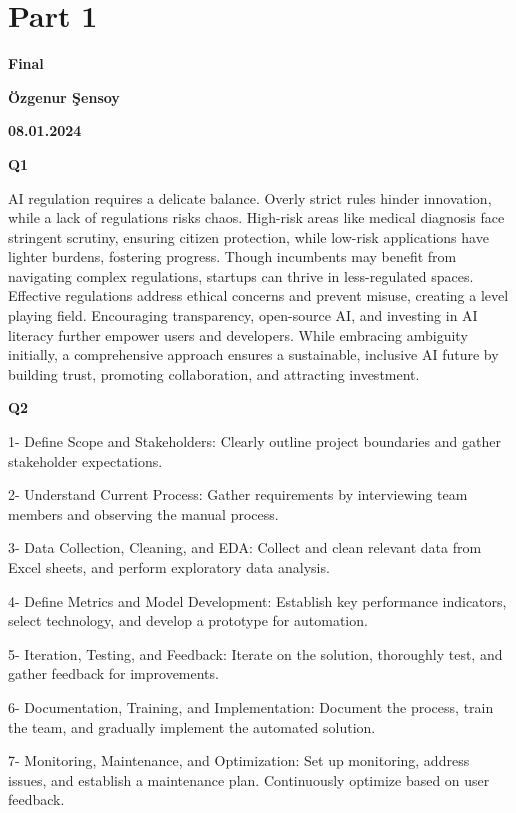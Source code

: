 \documentclass[
  letterpaper,
  DIV=11,
  numbers=noendperiod]{scrreprt}
\begin{document}

\hypertarget{part-1}{%
\chapter{\texorpdfstring{\textbf{Part 1}}{Part 1}}\label{part-1}}

\textbf{Final}

\textbf{Özgenur Şensoy}

\textbf{08.01.2024}

\textbf{Q1}

AI regulation requires a delicate balance. Overly strict rules hinder
innovation, while a lack of regulations risks chaos. High-risk areas
like medical diagnosis face stringent scrutiny, ensuring citizen
protection, while low-risk applications have lighter burdens, fostering
progress. Though incumbents may benefit from navigating complex
regulations, startups can thrive in less-regulated spaces. Effective
regulations address ethical concerns and prevent misuse, creating a
level playing field. Encouraging transparency, open-source AI, and
investing in AI literacy further empower users and developers. While
embracing ambiguity initially, a comprehensive approach ensures a
sustainable, inclusive AI future by building trust, promoting
collaboration, and attracting investment.

\textbf{Q2}

1- Define Scope and Stakeholders: Clearly outline project boundaries and
gather stakeholder expectations.

2- Understand Current Process: Gather requirements by interviewing team
members and observing the manual process.

3- Data Collection, Cleaning, and EDA: Collect and clean relevant data
from Excel sheets, and perform exploratory data analysis.

4- Define Metrics and Model Development: Establish key performance
indicators, select technology, and develop a prototype for automation.

5- Iteration, Testing, and Feedback: Iterate on the solution, thoroughly
test, and gather feedback for improvements.

6- Documentation, Training, and Implementation: Document the process,
train the team, and gradually implement the automated solution.

7- Monitoring, Maintenance, and Optimization: Set up monitoring, address
issues, and establish a maintenance plan. Continuously optimize based on
user feedback.
\end{document}

